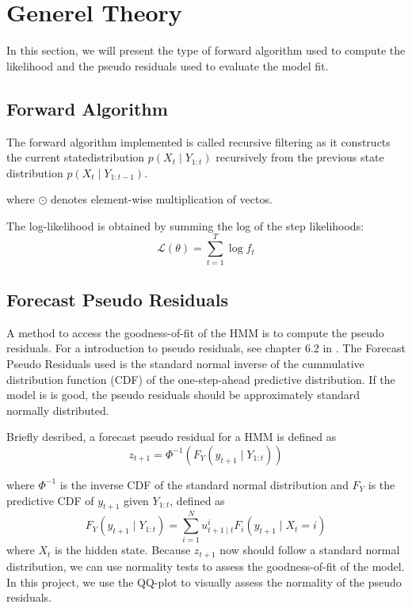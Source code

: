 \section{Generel Theory}
In this section, we will present the type of forward algorithm used to compute the likelihood 
and the pseudo residuals used to evaluate the model fit.


\subsection{Forward Algorithm} 
The forward algorithm implemented is called recursive filtering 
\citep{moler2024statistical} as it constructs the current 
statedistribution $p(X_t \mid Y_{1:t})$ recursively from the previous 
state distribution $p(X_t \mid Y_{1:t-1})$.

where $\odot$ denotes element-wise multiplication of vectos. 
\newline

The log-likelihood is obtained by summing the log of the step likelihoods:
\begin{equation}
    \mathcal{L}(\theta) = \sum_{t=1}^{T} \log f_t
    \label{eq:log_likelihood}
\end{equation}

\subsection{Forecast Pseudo Residuals}
A method to access the goodness-of-fit of the HMM is to compute the 
pseudo residuals. For a introduction to pseudo residuals, see chapter 6.2 in \citep{zucchini2016hidden}. \newline
The Forecast Pseudo Residuals used is the standard normal inverse of 
the cummulative distribution function (CDF) of
the one-step-ahead predictive distribution. If the model is is good, 
the pseudo residuals should be approximately standard normally distributed. 


Briefly desribed, a forecast pseudo residual for a HMM is defined as
\begin{equation}
    z_{t+1} = \Phi^{-1} (F_Y(y_{t+1}\mid Y_{1:t}))
    \label{eq:pseudo_residual}
\end{equation}

where $\Phi^{-1}$ is the inverse CDF of the standard normal distribution
and $F_Y$ is the predictive CDF of $y_{t+1}$ given $Y_{1:t}$, defined as
\begin{equation}
    F_Y(y_{t+1}\mid Y_{1:t}) = \sum_{i=1}^{N} u_{t+1 \mid t}^i F_i(y_{t+1} \mid X_t = i)
    \label{eq:predictive_cdf}
\end{equation}
where $X_t$ is the hidden state. \newline
Because $z_{t+1}$ now should follow a standard normal distribution, 
we can use normality tests to assess the goodness-of-fit of the model. \newline
In this project, we use the QQ-plot to visually assess the normality of the pseudo residuals. 

